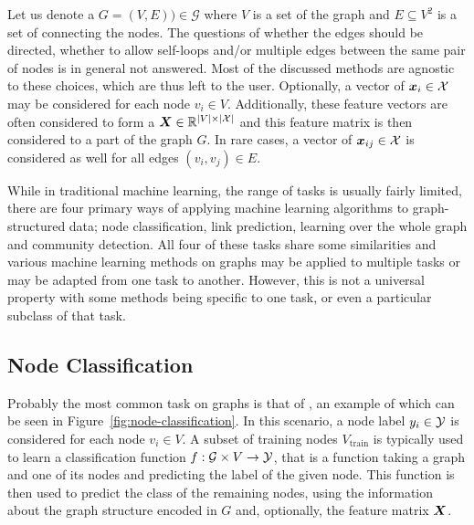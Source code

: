 Let us denote a  \( G = \left( V, E \right)) \in \mathcal{G} \) where \( V \) is a set of the graph  and \( E \subseteq V^2 \) is a set of  connecting the nodes. The questions of whether the edges should be directed, whether to allow self-loops and/or multiple edges between the same pair of nodes is in general not answered. Most of the discussed methods are agnostic to these choices, which are thus left to the user. Optionally, a vector of  \( \bm{x}_i \in \mathcal{X} \) may be considered for each node \( v_i \in V \). Additionally, these feature vectors are often considered to form a  \( \bm{X} \in \mathbb{R}^{\left\lvert V \right\rvert \times \left\lvert \mathcal{X} \right\rvert} \) and this feature matrix is then considered to a part of the graph \( G \). In rare cases, a vector of  \( \bm{x}_{ij} \in \mathcal{X} \) is considered as well for all edges \( \left( v_i, v_j \right) \in E \). 

While in traditional machine learning, the range of tasks is usually fairly limited, there are four primary ways of applying machine learning algorithms to graph-structured data; node classification, link prediction, learning over the whole graph and community detection. All four of these tasks share some similarities and various machine learning methods on graphs may be applied to multiple tasks or may be adapted from one task to another. However, this is not a universal property with some methods being specific to one task, or even a particular subclass of that task.

\subsection{Node Classification}

Probably the most common task on graphs is that of , an example of which can be seen in Figure~\ref{fig:node-classification}. In this scenario, a node label \( y_i \in \mathcal{Y} \) is considered for each node \( v_i \in V \). A subset of training nodes \( V_\mathrm{train} \) is typically used to learn a classification function \( f : \mathcal{G} \times V \to \mathcal{Y} \), that is a function taking a graph and one of its nodes and predicting the label of the given node. This function is then used to predict the class of the remaining nodes, using the information about the graph structure encoded in \( G \) and, optionally, the feature matrix \( \bm{X} \). 

